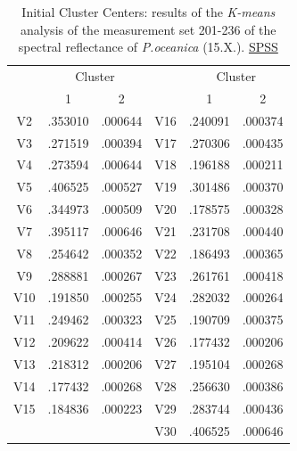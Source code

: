 \documentclass[10pt, a4paper]{article}
\begin{document}
\begin{appendices}
\begin{table}[htbp]
	\caption{Initial Cluster Centers: results of the \textit{K-means} analysis of the measurement set 201-236 of the spectral reflectance of \textit{P.oceanica} (15.X.).  \href{http://www.spss.com/}{SPSS}}
	\label{tab:13}
	\begin{center}
	\begin{tabular}{|c|c|c|c|c|c|}
		\hline\hline
		& \multicolumn{2}{|c|}{Cluster} &  & \multicolumn{2}{|c|}{Cluster}\\
		 & 1 & 2 &  & 1 & 2 \\ \hline\hline
		V2 &	.353010 &	.000644 &	V16 &	.240091 &	.000374 \\ \hline
		V3 &	 .271519 &	.000394 &	V17 &	.270306 &	.000435 \\ \hline
		V4 &	.273594 &	.000644 &	V18 &	.196188 &	.000211 \\ \hline
		V5 &	.406525 &	.000527 &	V19 &	.301486 &	.000370 \\ \hline
		V6 &	.344973 &	.000509 &	V20 &	.178575 &	.000328 \\ \hline
		V7 &	.395117 &	.000646 &	V21 &	.231708 &	.000440 \\ \hline
		V8 &	.254642 &	.000352 &	V22 &	.186493 &	.000365 \\ \hline
		V9 &	.288881 &	.000267 &	V23 &	.261761 &	.000418 \\ \hline
		V10 &	.191850 &	.000255 &	V24 &	.282032 &	.000264 \\ \hline
		V11 &	.249462 &	.000323 &	V25 &	.190709 &	.000375 \\ \hline
		V12 &	.209622 &	.000414 &	V26 &	.177432 &	.000206 \\ \hline
		V13 &	.218312 &	.000206 &	V27 &	.195104 &	.000268 \\ \hline
		V14 &	.177432 &	.000268 &	V28 &	.256630 &	.000386 \\ \hline
		V15 &	.184836 &	.000223 &	V29 &	.283744 &	.000436 \\ \hline
		 &	 &	 &		V30 &	.406525 &	.000646 \\ \hline
	\end{tabular}
	\end{center}
	\label{tab:20}
\end{table}


\end{appendices}
\end{document}
